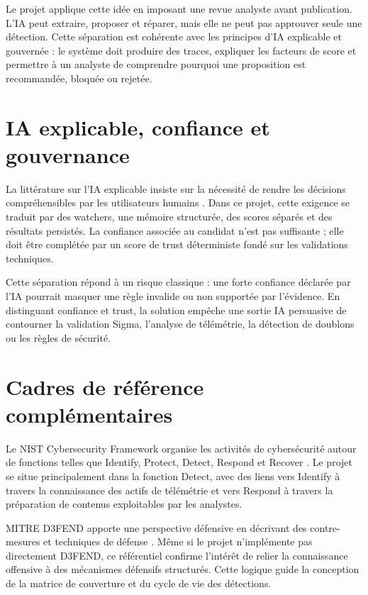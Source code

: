 Le projet applique cette idée en imposant une revue analyste avant publication. L'IA peut extraire, proposer et réparer, mais elle ne peut pas approuver seule une détection. Cette séparation est cohérente avec les principes d'IA explicable et gouvernée : le système doit produire des traces, expliquer les facteurs de score et permettre à un analyste de comprendre pourquoi une proposition est recommandée, bloquée ou rejetée.

\section{IA explicable, confiance et gouvernance}

La littérature sur l'IA explicable insiste sur la nécessité de rendre les décisions compréhensibles par les utilisateurs humains \cite{arrieta2020xai}. Dans ce projet, cette exigence se traduit par des watchers, une mémoire structurée, des scores séparés et des résultats persistés. La confiance associée au candidat n'est pas suffisante ; elle doit être complétée par un score de trust déterministe fondé sur les validations techniques.

Cette séparation répond à un risque classique : une forte confiance déclarée par l'IA pourrait masquer une règle invalide ou non supportée par l'évidence. En distinguant confiance et trust, la solution empêche une sortie IA persuasive de contourner la validation Sigma, l'analyse de télémétrie, la détection de doublons ou les règles de sécurité.

\section{Cadres de référence complémentaires}

Le NIST Cybersecurity Framework organise les activités de cybersécurité autour de fonctions telles que Identify, Protect, Detect, Respond et Recover \cite{nistcsf}. Le projet se situe principalement dans la fonction Detect, avec des liens vers Identify à travers la connaissance des actifs de télémétrie et vers Respond à travers la préparation de contenus exploitables par les analystes.

MITRE D3FEND apporte une perspective défensive en décrivant des contre-mesures et techniques de défense \cite{d3fend}. Même si le projet n'implémente pas directement D3FEND, ce référentiel confirme l'intérêt de relier la connaissance offensive à des mécanismes défensifs structurés. Cette logique guide la conception de la matrice de couverture et du cycle de vie des détections.
